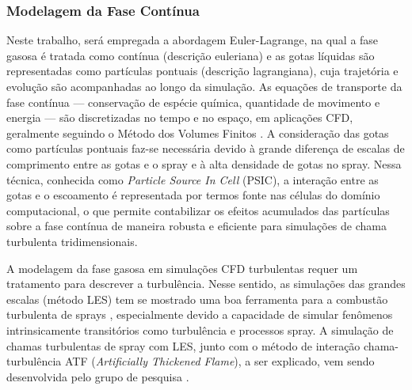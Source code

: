 \subsubsection{Modelagem da Fase Contínua} \label{sec:gas}

Neste trabalho, será empregada a abordagem Euler-Lagrange, na qual a fase gasosa é tratada como contínua (descrição euleriana) e as gotas líquidas são representadas como partículas pontuais (descrição lagrangiana), cuja trajetória e evolução são acompanhadas ao longo da simulação. 
As equações de transporte da fase contínua — conservação de espécie química, quantidade de movimento e energia — são discretizadas no tempo e no espaço, em aplicações CFD, geralmente seguindo o Método dos Volumes Finitos \cite{Anderson2009}.
A consideração das gotas como partículas pontuais faz-se necessária devido à grande diferença de escalas de comprimento entre as gotas e o spray e à alta densidade de gotas no spray.
Nessa técnica, conhecida como \emph{Particle Source In Cell} (PSIC), a interação entre as gotas e o escoamento é representada por termos fonte nas células do domínio computacional, o que permite contabilizar os efeitos acumulados das partículas sobre a fase contínua de maneira robusta e eficiente para simulações de chama turbulenta tridimensionais.

A modelagem da fase gasosa em simulações CFD turbulentas requer um tratamento para descrever a turbulência. 
Nesse sentido, as simulações das grandes escalas (método LES) tem se mostrado uma boa ferramenta para a combustão turbulenta de sprays \cite{SacomanoF2020CF}, especialmente devido a capacidade de simular fenômenos intrinsicamente transitórios como turbulência e processos spray.
A simulação de chamas turbulentas de spray com LES, junto com o método de interação chama-turbulência ATF (\emph{Artificially Thickened Flame}), a ser explicado, vem sendo desenvolvida pelo grupo de pesquisa \cite{SacomanoF2017PhD,SacomanoF2019Fluids,SacomanoF2017CF,SacomanoF2020CF,SacomanoF2018CTM}.

